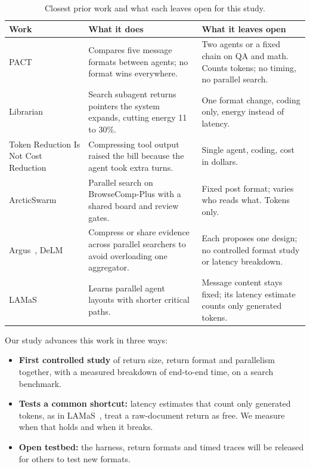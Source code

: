 \documentclass[11pt]{article}
\begin{document}
\begin{table}[!htbp]
  \centering\small
  \caption{Closest prior work and what each leaves open for this study.}
  \label{tab:related}
  \begin{tabularx}{\linewidth}{@{}P{3.3cm}LL@{}}
    \toprule
    \textbf{Work} & \textbf{What it does} & \textbf{What it leaves open} \\
    \midrule
    PACT~\citep{huang2026pact} & Compares five message formats between agents; no format wins everywhere. & Two agents or a fixed chain on QA and math. Counts tokens; no timing, no parallel search. \\
    Librarian~\citep{librarian2026} & Search subagent returns pointers the system expands, cutting energy 11 to 30\%. & One format change, coding only, energy instead of latency. \\
    Token Reduction Is Not Cost Reduction~\citep{weinberger2026token} & Compressing tool output raised the bill because the agent took extra turns. & Single agent, coding, cost in dollars. \\
    ArcticSwarm~\citep{yoon2026arcticswarm} & Parallel search on BrowseComp-Plus with a shared board and review gates. & Fixed post format; varies who reads what. Tokens only. \\
    Argus~\citep{zhang2026argus}, DeLM~\citep{mao2026delm} & Compress or share evidence across parallel searchers to avoid overloading one aggregator. & Each proposes one design; no controlled format study or latency breakdown. \\
    LAMaS~\citep{shi2026lamas} & Learns parallel agent layouts with shorter critical paths. & Message content stays fixed; its latency estimate counts only generated tokens. \\
    \bottomrule
  \end{tabularx}
\end{table}

\noindent Our study advances this work in three ways:
\begin{itemize}
  \item \textbf{First controlled study} of return size, return format and parallelism together, with a measured breakdown of end-to-end time, on a search benchmark.
  \item \textbf{Tests a common shortcut:} latency estimates that count only generated tokens, as in LAMaS~\citep{shi2026lamas}, treat a raw-document return as free. We measure when that holds and when it breaks.
  \item \textbf{Open testbed:} the harness, return formats and timed traces will be released for others to test new formats.
\end{itemize}
\end{document}
